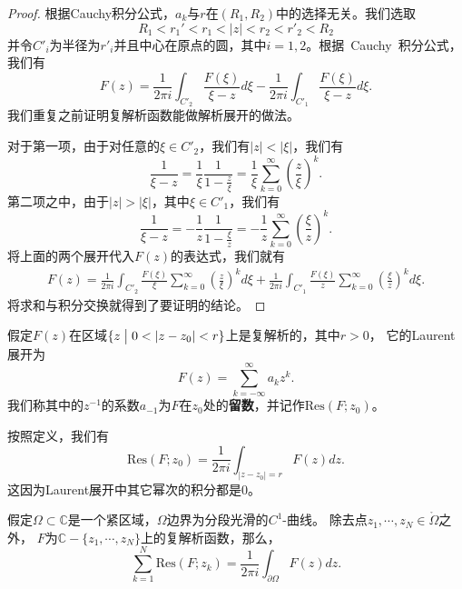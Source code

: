 \begin{proof}
 根据Cauchy积分公式，$a_k$与$r$在$(R_1,R_2)$中的选择无关。我们选取
 \[R_1<r_1'<r_1<|z|<r_2<r'_2<R_2\]
 并令$C'_{i}$为半径为$r'_i$并且中心在原点的圆，其中$i=1,2$。根据~Cauchy~积分公式，我们有
\begin{equation*}
F(z)=\frac{1}{2\pi i}\int_{C'_2}\frac{F(\xi)}{\xi-z}d\xi-\frac{1}{2\pi i}\int_{C'_1}\frac{F(\xi)}{\xi-z}d\xi.
\end{equation*}
我们重复之前证明复解析函数能做解析展开的做法。

对于第一项，由于对任意的$\xi \in C'_2$，我们有$|z|<|\xi|$，我们有
\begin{equation*}
\frac{1}{\xi-z}=\frac{1}{\xi}\frac{1}{1-\frac{z}{\xi}}=\frac{1}{\xi}\sum_{k=0}^\infty\left(\frac{z}{\xi}\right)^k.
\end{equation*}
第二项之中，由于$|z|>|\xi|$，其中$\xi \in C'_1$，我们有
\begin{equation*}
\frac{1}{\xi-z}=-\frac{1}{z}\frac{1}{1-\frac{\xi}{z}}=-\frac{1}{z}\sum_{k=0}^\infty\left(\frac{\xi}{z}\right)^k.
\end{equation*}
将上面的两个展开代入$F(z)$的表达式，我们就有
\begin{align*}
F(z)=\frac{1}{2\pi i}\int_{C'_2}\frac{F(\xi)}{\xi}\sum_{k=0}^\infty\left(\frac{z}{\xi}\right)^kd\xi+\frac{1}{2\pi i}\int_{C'_1}\frac{F(\xi)}{z}\sum_{k=0}^\infty\left(\frac{\xi}{z}\right)^kd\xi.
\end{align*}
将求和与积分交换就得到了要证明的结论。
\end{proof}



\begin{definition}假定$F(z)$在区域$\{z\bigm|0<|z-z_0|<r\}$上是复解析的，其中$r>0$，
    它的Laurent展开为
\[F(z)=\sum_{k=-\infty}^\infty a_kz^k.\]
我们称其中的$z^{-1}$的系数$a_{-1}$为$F$在$z_0$处的\textbf{留数}，并记作$\textrm{Res}(F;z_0)$。
\end{definition}
\begin{remark}
按照定义，我们有
\begin{equation*}
\textrm{Res}(F;z_0)=\frac{1}{2\pi i}\int_{|z-z_0|=r} {F(z)}dz.
\end{equation*}
这因为Laurent展开中其它幂次的积分都是$0$。
\end{remark}
\begin{theorem}[留数定理]
假定$\Omega\subset \mathbb{C}$是一个紧区域，$\Omega$边界为分段光滑的$C^1$-曲线。
除去点$z_1,\cdots,z_N\in \mathring{\Omega}$之外，
$F$为$\mathbb{C}-\{z_1,\cdots,z_N\}$上的复解析函数，那么，
\begin{equation*}
\sum_{k=1}^N\textrm{Res}(F;z_k)=\frac{1}{2\pi i}\int_{\partial \Omega} {F(z)}dz.
\end{equation*}
\end{theorem}

